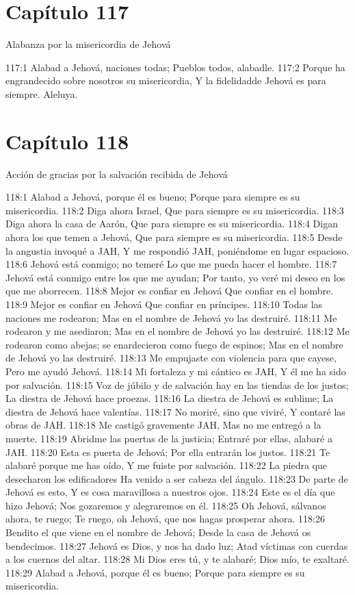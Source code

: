\section*{Capítulo 117}
Alabanza por la misericordia de Jehová 
 
117:1 Alabad a Jehová, naciones todas; 
Pueblos todos, alabadle. 
117:2 Porque ha engrandecido sobre nosotros su misericordia, 
Y la fidelidadde Jehová es para siempre. 
Aleluya. 
\section*{Capítulo 118}
Acción de gracias por la salvación recibida de Jehová 
 
118:1 Alabad a Jehová, porque él es bueno; 
Porque para siempre es su misericordia. 
118:2 Diga ahora Israel, 
Que para siempre es su misericordia. 
118:3 Diga ahora la casa de Aarón, 
Que para siempre es su misericordia. 
118:4 Digan ahora los que temen a Jehová, 
Que para siempre es su misericordia. 
118:5 Desde la angustia invoqué a JAH, 
Y me respondió JAH, poniéndome en lugar espacioso. 
118:6 Jehová está conmigo; no temeré 
Lo que me pueda hacer el hombre. 
118:7 Jehová está conmigo entre los que me ayudan; 
Por tanto, yo veré mi deseo en los que me aborrecen. 
118:8 Mejor es confiar en Jehová 
Que confiar en el hombre. 
118:9 Mejor es confiar en Jehová 
Que confiar en príncipes. 
118:10 Todas las naciones me rodearon; 
Mas en el nombre de Jehová yo las destruiré. 
118:11 Me rodearon y me asediaron; 
Mas en el nombre de Jehová yo las destruiré. 
118:12 Me rodearon como abejas; se enardecieron como fuego de espinos; 
Mas en el nombre de Jehová yo las destruiré. 
118:13 Me empujaste con violencia para que cayese, 
Pero me ayudó Jehová. 
118:14 Mi fortaleza y mi cántico es JAH, 
Y él me ha sido por salvación. 
118:15 Voz de júbilo y de salvación hay en las tiendas de los justos; 
La diestra de Jehová hace proezas. 
118:16 La diestra de Jehová es sublime; 
La diestra de Jehová hace valentías. 
118:17 No moriré, sino que viviré, 
Y contaré las obras de JAH. 
118:18 Me castigó gravemente JAH, 
Mas no me entregó a la muerte. 
118:19 Abridme las puertas de la justicia; 
Entraré por ellas, alabaré a JAH. 
118:20 Esta es puerta de Jehová; 
Por ella entrarán los justos. 
118:21 Te alabaré porque me has oído, 
Y me fuiste por salvación. 
118:22 La piedra que desecharon los edificadores 
Ha venido a ser cabeza del ángulo. 
118:23 De parte de Jehová es esto, 
Y es cosa maravillosa a nuestros ojos. 
118:24 Este es el día que hizo Jehová; 
Nos gozaremos y alegraremos en él. 
118:25 Oh Jehová, sálvanos  ahora, te ruego; 
Te ruego, oh Jehová, que nos hagas prosperar ahora. 
118:26 Bendito el que viene en el nombre de Jehová; 
Desde la casa de Jehová os bendecimos. 
118:27 Jehová es Dios, y nos ha dado luz; 
Atad víctimas con cuerdas a los cuernos del altar. 
118:28 Mi Dios eres tú, y te alabaré; 
Dios mío, te exaltaré. 
118:29 Alabad a Jehová, porque él es bueno; 
Porque para siempre es su misericordia. 
